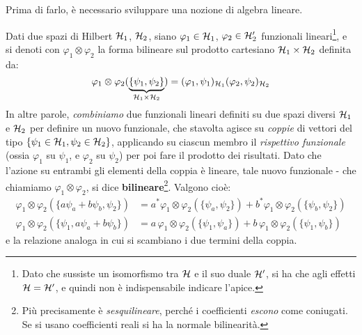 \documentclass[../../FisicaTeorica.tex]{subfiles}
\begin{document}
\begin{comment}
Partendo da due particelle con funzioni d'onda $\psi_1(\vec{x}^{(1)}) \in L^2(\bb{R}^3,d^3x)$  e $\psi(\vec{x}^{(2)})\in L^2(\bb{R}^3, d^3x)$, il sistema composto da entrambe avrà una funzione d'onda $\psi(\vec{x}^{(1)}, \vec{x}^{(2)}) \in L^2(\bb{R}^6, d^3x^{(1)},d^3x^{(2)})$. Qual è la relazione tra quest'ultima $\psi$ \q{composta} e le due \q{singole}?\\
\end{comment}
Prima di farlo, è necessario sviluppare una nozione di algebra lineare.\\
\begin{dfn}
Dati due spazi di Hilbert $\mathcal{H}_1$, $\mathcal{H}_2$, siano $\varphi_1 \in \mathcal{H}_1$, $\varphi_2\in \mathcal{H}_2'$ funzionali lineari\footnote{Dato che sussiste un isomorfismo tra $\mathcal{H}$ e il suo duale $\mathcal{H}'$, si ha che agli effetti $\mathcal{H}=\mathcal{H}'$, e quindi non è indispensabile indicare l'apice.}, e si denoti con $\varphi_1 \otimes \varphi_2$ la forma bilineare sul prodotto cartesiano $\mathcal{H}_1 \times \mathcal{H}_2$ definita da:
\begin{equation}
\varphi_1 \otimes \varphi_2 (\underbrace{\{\psi_1, \psi_2\}}_{\mathcal{H}_1 \times \mathcal{H}_2})=(\varphi_1, \psi_1)_{\mathcal{H}_1} (\varphi_2, \psi_2)_{\mathcal{H}_2}
\label{eqn:forma-bilineare}
\end{equation}
In altre parole, \textit{combiniamo} due funzionali lineari definiti su due spazi diversi $\mathcal{H}_1$ e $\mathcal{H}_2$ per definire un nuovo funzionale, che stavolta agisce su \textit{coppie} di vettori del tipo $\{\psi_1 \in \mathcal{H}_1, \psi_2 \in \mathcal{H}_2\}$, applicando su ciascun membro il \textit{rispettivo funzionale} (ossia $\varphi_1$ su $\psi_1$, e $\varphi_2$ su $\psi_2$) per poi fare il prodotto dei risultati. Dato che l'azione su entrambi gli elementi della coppia è lineare, tale nuovo funzionale - che chiamiamo $\varphi_1 \otimes \varphi_2$, si dice \textbf{bilineare}\footnote{Più precisamente è \textit{sesquilineare}, perché i coefficienti  \textit{escono} come coniugati. Se si usano coefficienti reali si ha la normale bilinearità.}. Valgono cioè:
\begin{align*}
\varphi_1 \otimes \varphi_2(\{a\psi_a + b\psi_b,\psi_2\})&=a^*\varphi_1\otimes\varphi_2(\{\psi_a,\psi_2\}) + b^* \varphi_1 \otimes \varphi_2(\{\psi_b,\psi_2\})\\
\varphi_1\otimes \varphi_2(\{\psi_1, a\psi_a+b\psi_b\})&=a\,\varphi_1\otimes\varphi_2(\{\psi_1,\psi_a\})+b\,\varphi_1\otimes\varphi_2(\{\psi_1,\psi_b\})
\end{align*}
e la relazione analoga in cui si scambiano i due termini della coppia.\\


\end{dfn}
\end{document}

